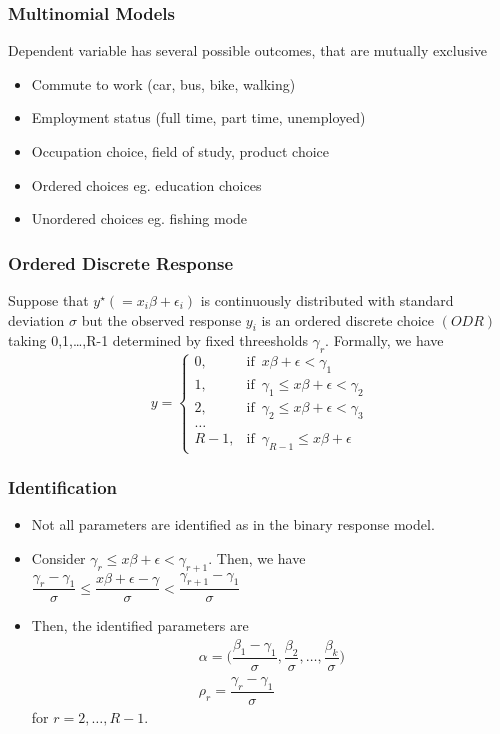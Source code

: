 \documentclass{beamer}
\newcommand{\1}{\mathbb{1}}
\begin{document}
\begin{frame}\frametitle{Multinomial Models}
Dependent variable has several possible outcomes, that are mutually exclusive
\begin{itemize}
 \item Commute to work (car, bus, bike, walking)
 \item Employment status (full time, part time, unemployed)
 \item Occupation choice, field of study, product choice
\end{itemize}
\begin{itemize}
 \item Ordered choices eg. education choices
 \item Unordered choices eg. fishing mode
\end{itemize}
\end{frame}

\begin{frame}\frametitle{Ordered Discrete Response}
Suppose that $y^{\star}(=x_i\beta + \epsilon_i)$ is continuously distributed with standard deviation $\sigma$ but the observed response $y_i$ is an ordered discrete choice $(ODR)$ taking 0,1,\ldots,R-1 determined by fixed threesholds $\gamma_r$. Formally, we have
\begin{equation}
y = \begin{cases} 0, & \mbox{if } \, x\beta + \epsilon < \gamma_1  \\ 
1, & \mbox{if } \, \gamma_1 \leq x\beta + \epsilon < \gamma_2 \\
2, & \mbox{if } \, \gamma_2 \leq x\beta + \epsilon < \gamma_3 \\
\ldots\\
R-1, & \mbox{if } \, \gamma_{R-1} \leq x\beta + \epsilon 
\end{cases}
\end{equation}
\end{frame}

\begin{frame}\frametitle{Identification}
\begin{itemize}
 \item Not all parameters are identified as in the binary response model.
 \item Consider $\gamma_r \leq x\beta + \epsilon < \gamma_{r+1}$. Then, we have $\dfrac{\gamma_r -\gamma_1}{\sigma} \leq \dfrac{x\beta + \epsilon -\gamma}{\sigma} < \dfrac{\gamma_{r+1} -\gamma_1}{\sigma}$ 
 \item Then, the identified parameters are 
 \begin{eqnarray}
  \alpha = \bigg( \dfrac{\beta_1 - \gamma_1}{\sigma},\dfrac{\beta_2}{\sigma}, \ldots, \dfrac{\beta_k}{\sigma} \bigg)\\
  \rho_r = \dfrac{\gamma_r - \gamma_1}{\sigma}
 \end{eqnarray}
for $r=2,\ldots, R-1$. 
\end{itemize}
\end{frame}
\end{document}
